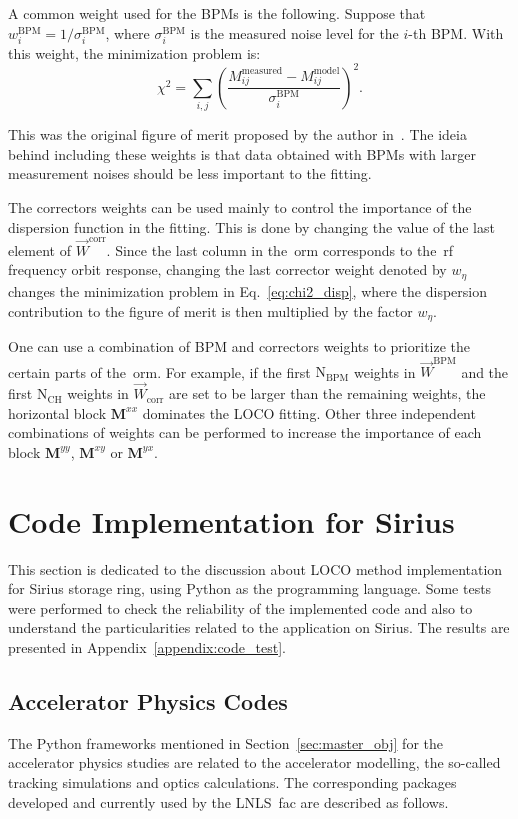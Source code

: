 A common weight used for the BPMs is the following. Suppose that $w^{\mathrm{BPM}}_{i} = 1/\sigma^{\mathrm{BPM}}_{i}$, where $\sigma^{\mathrm{BPM}}_{i}$ is the measured noise level for the $i$-th BPM. With this weight, the minimization problem is:
\begin{equation}
    \chi^2 = \sum_{i, j} \left(\dfrac{M^{\mathrm{measured}}_{ij} - M^{\mathrm{model}}_{ij}}{\sigma^{\mathrm{BPM}}_{i}}\right)^2.
    \label{eq:chi2_original}
\end{equation}

This was the original figure of merit proposed by the author in~\cite{safranek1997}. The ideia behind including these weights is that data obtained with BPMs with larger measurement noises should be less important to the fitting.

The correctors weights can be used mainly to control the importance of the dispersion function in the fitting. This is done by changing the value of the last element of $\vec{W}^{\mathrm{corr}}$. Since the last column in the~\gls{orm} corresponds to the~\gls{rf} frequency orbit response, changing the last corrector weight denoted by $w_{\eta}$ changes the minimization problem in Eq.~\eqref{eq:chi2_disp}, where the dispersion contribution to the figure of merit is then multiplied by the factor $w_{\eta}$.

One can use a combination of BPM and correctors weights to prioritize the certain parts of the~\gls{orm}. For example, if the first $\mathrm{N}_{\mathrm{BPM}}$ weights in $\vec{W}^{\mathrm{BPM}}$ and the first $\mathrm{N}_{\mathrm{CH}}$ weights in $\vec{W}_{\mathrm{corr}}$ are set to be larger than the remaining weights, the horizontal block $\mathbf{M}^{xx}$ dominates the LOCO fitting. Other three independent combinations of weights can be performed to increase the importance of each block $\mathbf{M}^{yy}$, $\mathbf{M}^{xy}$ or $\mathbf{M}^{yx}$.

\section{Code Implementation for Sirius}
This section is dedicated to the discussion about LOCO method implementation for Sirius storage ring, using Python as the programming language. Some tests were performed to check the reliability of the implemented code and also to understand the particularities related to the application on Sirius. The results are presented in Appendix~\ref{appendix:code_test}.

\subsection{Accelerator Physics Codes}
The Python frameworks mentioned in Section~\ref{sec:master_obj} for the accelerator physics studies are related to the accelerator modelling, the so-called tracking simulations and optics calculations. The corresponding packages developed and currently used by the LNLS~\gls{fac} are described as follows.

